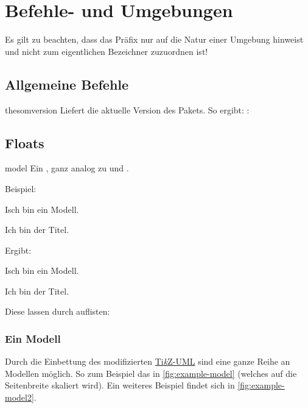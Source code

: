 \documentclass{sopra-base}
\begin{document}
\section{Befehle- und Umgebungen}

Es gilt zu beachten, dass das Präfix  nur auf die Natur einer Umgebung hinweist und nicht zum eigentlichen Bezeichner zuzuordnen ist!

\subsection{Allgemeine Befehle}

\begin{command}{thesomversion}{}
    Liefert die aktuelle Version des Pakets. So ergibt: : \thesomversion\\
\end{command}

\subsection{Floats}

\begin{environment}{model}{}
    Ein , ganz analog zu  und .
\end{environment}

Beispiel:
\begin{plainlatex}[morekeywords={[3]{model}}]
\begin{model}
    \centering
    Isch bin ein Modell.
    \caption[Und ich eigentlich kürzer.]{Ich bin der Titel.}
\end{model}
\end{plainlatex}
Ergibt:
\begin{model}
    \centering
    Isch bin ein Modell.
    \caption[Und ich eigentlich kürzer.]{Ich bin der Titel.}
\end{model}

Diese lassen durch  auflisten:

\listofmodel

\subsubsection{Ein Modell}
Durch die Einbettung des modifizierten \href{https://perso.ensta-paris.fr/~kielbasi/tikzuml/}{Ti\textit{k}Z-UML} sind eine ganze Reihe an Modellen möglich. So zum Beispiel das in \autoref{fig:example-model} (welches auf die Seitenbreite skaliert wird). Ein weiteres Beispiel findet sich in \autoref{fig:example-model2}.
\end{document}
